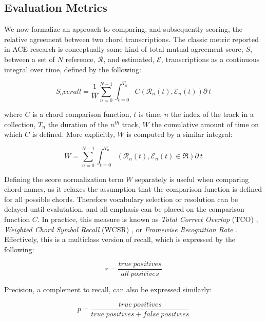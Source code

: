 \subsection{Evaluation Metrics}
\label{subsec:evaluation_metrics}

We now formalize an approach to comparing, and subsequently scoring, the relative agreement between two chord transcriptions.
The classic metric reported in ACE research is conceptually some kind of total mutual agreement score, $S$, between a set of $N$ reference, $\mathcal{R}$, and estimated, $\mathcal{E}$, transcriptions as a continuous integral over time, defined by the following:

\begin{equation}
S_overall = \frac{1}{W}\sum_{n=0}^{N-1}\int_{t=0}^{T_n}C(\mathcal{R}_n(t), \mathcal{E}_n(t))\partial~t
\end{equation}

\noindent where $C$ is a chord comparison function, $t$ is time, $n$ the index of the track in a collection, $T_n$ the duration of the $n^{th}$ track, $W$ the cumulative amount of time on which $C$ is defined.
More explicitly, $W$ is computed by a similar integral:

\begin{equation}
W = \sum_{n=0}^{N-1}\int_{t=0}^{T_n}(\mathcal{R}_n(t), \mathcal{E}_n(t) \in \Re)\partial~t
\end{equation}

Defining the score normalization term $W$ separately is useful when comparing chord names, as it relaxes the assumption that the comparison function is defined for all possible chords.
Therefore vocabulary selection or resolution can be delayed until evalutation, and all emphasis can be placed on the comparison function $C$.
In practice, this measure is known as \emph{Total Correct Overlap} (TCO) \cite{Mauch, Harte, McVicar}, \emph{Weighted Chord Symbol Recall} (WCSR) \cite{MIReX}, or \emph{Framewise Recognition Rate} \cite{Cho2014}.
Effectively, this is a multiclass version of recall, which is expressed by the following:

\begin{equation}
r = \frac{true~positives}{all~positives}
\end{equation}

Precision, a complement to recall, can also be expressed similarly:

\begin{equation}
p = \frac{true~positives}{true~positives + false~positives}
\end{equation}

